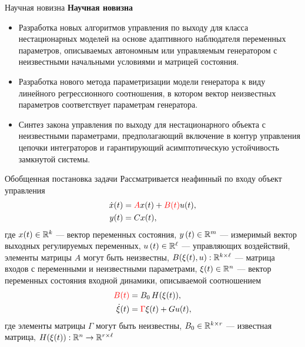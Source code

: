 \begin{frame}{Научная новизна} \hypertarget{slide\insertframenumber}{}
	\textbf{Научная новизна} 
	\vspace*{0.5cm}
	\begin{itemize}
		\item 	 Разработка новых алгоритмов управления по выходу для класса нестационарных моделей на основе адаптивного наблюдателя переменных параметров, описываемых автономным или управляемым генератором с неизвестными начальными условиями и матрицей состояния.
		\vspace*{2mm}
		\item  Разработка нового метода параметризации модели генератора к виду линейного регрессионного соотношения, в котором вектор неизвестных параметров соответствует параметрам генератора.
		\vspace*{2mm}
		\item  Синтез закона управления по выходу для нестационарного объекта с неизвестными параметрами, предполагающий включение в контур управления цепочки интеграторов и гарантирующий асимптотическую устойчивость замкнутой системы.
	\end{itemize}
\end{frame}


\begin{frame}{Обобщенная постановка задачи}	\hypertarget{slide\insertframenumber}{}
	Рассматривается неафинный по входу объект управления
	\begin{align}
		\label{plant_x}
		\dot x(t) &= {\color{red} A}x(t) + {\color{red} B(t)} u(t),\\
		\label{plant_y}
		y(t) &= Cx(t),
	\end{align}
	где  $x(t)\in\mathbb{R}^k$ ---  вектор переменных состояния,  $y\left( t \right) \in \mathbb{R}{^m}$ --- измеримый вектор выходных регулируемых переменных,  $u\left( t \right) \in\mathbb{R} {^\ell}$ ---   управляющих воздействий, элементы матрицы $A$ могут быть неизвестны, $B(\xi(t),u): \mathbb{R}^{k\times\ell}$ --- матрица входов с переменными и неизвестными параметрами, $\xi(t) \in \mathbb{R}^n$ --- вектор переменных состояния входной динамики, описываемой соотношением
	\begin{align}
		\label{Bxiu}
		{\color{red} B(t)} &= B_0\,H(\xi(t)),\\
		\label{xi}
		\dot{\xi}(t) &={\color{red} \Gamma}\xi(t) +Gu(t),
	\end{align}
	где элементы матрицы $\Gamma$ могут быть неизвестны, $B_0\in\mathbb{R}^{k\times r}$ --- известная матрица, $H(\xi(t)): \mathbb{R}^n \to \mathbb{R}^{r\times \ell}$
\end{frame}

